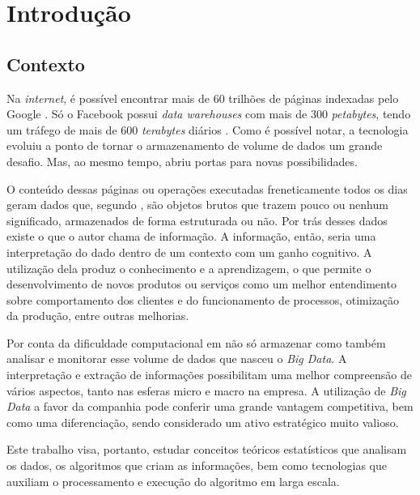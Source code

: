\chapter*[Introdução]{Introdução}

\section{Contexto}

Na \emph{internet}, é possível encontrar mais de 60 trilhões de páginas indexadas pelo Google \cite{GOO01}. Só o Facebook possui \emph{data warehouses}\footnotemark {} com mais de 300 \emph{petabytes}, tendo um tráfego de mais de 600 \emph{terabytes} diários \cite{FAC01}. Como é possível notar, a tecnologia evoluiu a ponto de tornar o armazenamento de volume de dados um grande desafio. Mas, ao mesmo tempo, abriu portas para novas possibilidades.

O conteúdo dessas páginas ou operações executadas freneticamente todos os dias geram dados que, segundo , são objetos brutos que trazem pouco ou nenhum significado, armazenados de forma estruturada ou não. Por trás desses dados existe o que o autor chama de informação. A informação, então, seria uma interpretação do dado dentro de um contexto com um ganho cognitivo. A utilização dela produz o conhecimento e a aprendizagem, o que permite o desenvolvimento de novos produtos ou serviços como um melhor entendimento sobre comportamento dos clientes e do funcionamento de processos, otimização da produção, entre outras melhorias.

Por conta da dificuldade computacional em não só armazenar como também analisar e monitorar esse volume de dados que nasceu o \emph{Big Data}. A interpretação e extração de informações possibilitam uma melhor compreensão de vários aspectos, tanto nas esferas micro e macro na empresa. A utilização de \emph{Big Data} a favor da companhia pode conferir uma grande vantagem competitiva, bem como uma diferenciação, sendo considerado um ativo estratégico muito valioso.

Este trabalho visa, portanto, estudar conceitos teóricos estatísticos que analisam os dados, os algoritmos que criam as informações, bem como tecnologias que auxiliam o processamento e execução do algoritmo em larga escala.
